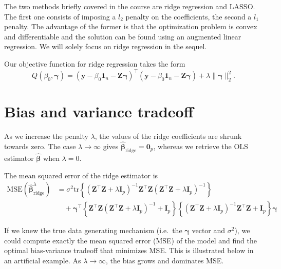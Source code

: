 \documentclass[]{book}
\theoremstyle{definition}
\theoremstyle{definition}
\theoremstyle{definition}
\theoremstyle{remark}
\begin{document}
The two methods briefly covered in the course are ridge regression and
LASSO. The first one consists of imposing a \(l_2\) penalty on the
coefficients, the second a \(l_1\) penalty. The advantage of the former
is that the optimization problem is convex and differentiable and the
solution can be found using an augmented linear regression. We will
solely focus on ridge regression in the sequel.

Our objective function for ridge regression takes the form
\[Q(\beta_0, \boldsymbol{\gamma}) = (\boldsymbol{y} - \beta_0 \mathbf{1}_n -\mathbf{Z}\boldsymbol{\gamma})^\top(\boldsymbol{y} - \beta_0 \mathbf{1}_n -\mathbf{Z}\boldsymbol{\gamma}) + \lambda \|\boldsymbol{\gamma}\|^2_2. \]

\hypertarget{bias-and-variance-tradeoff}{%
\section{Bias and variance tradeoff}\label{bias-and-variance-tradeoff}}

As we increase the penalty \(\lambda\), the values of the ridge
coefficients are shrunk towards zero. The case \(\lambda \to \infty\)
gives \(\hat{\boldsymbol{\beta}}_{\mathrm{ridge}}=\boldsymbol{0}_p\),
whereas we retrieve the OLS estimator \(\hat{\boldsymbol{\beta}}\) when
\(\lambda=0\).

The mean squared error of the ridge estimator is \begin{align*}
\mathrm{MSE}(\hat{\boldsymbol{\beta}}_{\mathrm{ridge}}^{\lambda}) &= \sigma^2 \mathrm{tr}\left\{(\mathbf{Z}^\top\mathbf{Z} + \lambda \mathbf{I}_p)^{-1}\mathbf{Z}^\top\mathbf{Z}(\mathbf{Z}^\top\mathbf{Z} + \lambda \mathbf{I}_p)^{-1}\right\} \\&\quad + \boldsymbol{\gamma}^\top \left\{ \mathbf{Z}^\top\mathbf{Z}(\mathbf{Z}^\top\mathbf{Z} + \lambda \mathbf{I}_p)^{-1} + \mathbf{I}_p \right\} \left\{ (\mathbf{Z}^\top\mathbf{Z} + \lambda \mathbf{I}_p)^{-1}\mathbf{Z}^\top\mathbf{Z} + \mathbf{I}_p \right\}\boldsymbol{\gamma}
\end{align*}

If we knew the true data generating mechanism (i.e.~the
\(\boldsymbol{\gamma}\) vector and \(\sigma^2\)), we could compute
exactly the mean squared error (MSE) of the model and find the optimal
bias-variance tradeoff that minimizes MSE. This is illustrated below in
an artificial example. As \(\lambda \to \infty\), the bias grows and
dominates MSE.
\end{document}

